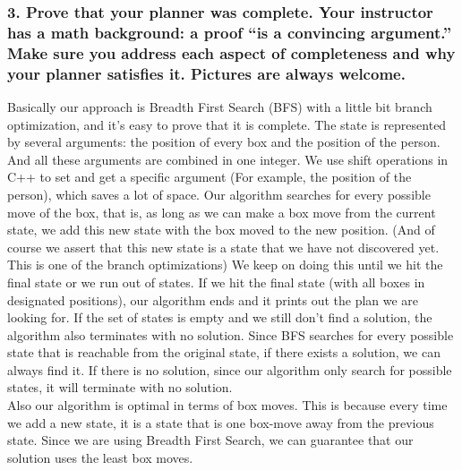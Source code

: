 \documentclass[10pt, letter]{article}
\begin{document}
\subsubsection*{3. Prove that your planner was complete. Your instructor has a math background: a proof ``is
a convincing argument.'' Make sure you address each aspect of completeness and why your
planner satisfies it. Pictures are always welcome.}
Basically our approach is Breadth First Search (BFS) with a little bit branch optimization, and it's easy to prove that it is complete.
The state is represented by several arguments: the position of every box and the position of the person.
And all these arguments are combined in one integer.
We use shift operations in C++ to set and get a specific argument (For example, the position of the person), which saves a lot of space.
Our algorithm searches for every possible move of the box, that is, as long as we can make a box move from the current state, we add this new state with the box moved to the new position. 
(And of course we assert that this new state is a state that we have not discovered yet. This is one of the branch optimizations)
We keep on doing this until we hit the final state or we run out of states.
If we hit the final state (with all boxes in designated positions), our algorithm ends and it prints out the plan we are looking for.
If the set of states is empty and we still don't find a solution, the algorithm also terminates with no solution.
Since BFS searches for every possible state that is reachable from the original state, if there exists a solution, we can always find it.
If there is no solution, since our algorithm only search for possible states, it will terminate with no solution.
\\Also our algorithm is optimal in terms of box moves. This is because every time we add a new state, it is a state that is one box-move away from the previous state.
Since we are using Breadth First Search, we can guarantee that our solution uses the least box moves.
\end{document}
